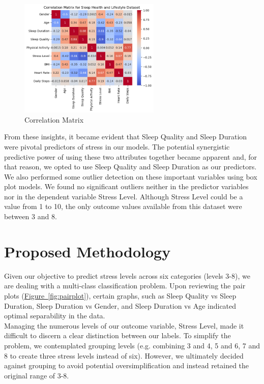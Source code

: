 \documentclass[11pt, letterpaper]{article}
\begin{document}
    \begin{figure}[H]
        \centering
        \includegraphics[width=0.60\textwidth]{correlation.png}
        \caption{Correlation Matrix}
        \label{fig:correlation}
    \end{figure}

    \noindent From these insights, it became evident that Sleep Quality and Sleep Duration were pivotal predictors of stress in our models. The potential synergistic predictive power of using these two attributes together became apparent and, for that reason, we opted to use Sleep Quality and Sleep Duration as our predictors.\\
    
    \noindent We also performed some outlier detection on these important variables using box plot models. We found no significant outliers neither in the predictor variables nor in the dependent variable Stress Level. Although Stress Level could be a value from 1 to 10, the only outcome values available from this dataset were between 3 and 8.\\
    
    \section*{Proposed Methodology}
    \noindent Given our objective to predict stress levels across six categories (levels 3-8), we are dealing with a multi-class classification problem. Upon reviewing the pair plots (\hyperref[fig:pairplot]{Figure~\ref*{fig:pairplot}}), certain graphs, such as Sleep Quality vs Sleep Duration, Sleep Duration vs Gender, and Sleep Duration vs Age indicated optimal separability in the data.\\

    \noindent Managing the numerous levels of our outcome variable, Stress Level, made it difficult to discern a clear distinction between our labels. To simplify the problem, we contemplated grouping levels (e.g. combining 3 and 4, 5 and 6, 7 and 8 to create three stress levels instead of six). However, we ultimately decided against grouping to avoid potential oversimplification and instead retained the original range of 3-8.\\
\end{document}
